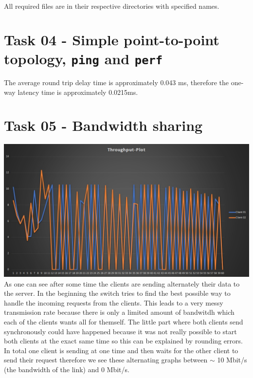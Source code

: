 \documentclass{article}
\begin{document}
	\pagestyle{fancy}
	
	All required files are in their respective directories with specified names.	
	
	\section*{Task 04 - Simple point-to-point topology, \texttt{ping} and \texttt{perf}}
	\begin{adjustwidth}{2em}{2em}
		The average round trip delay time is approximately 0.043 ms, therefore the one-way latency time is approximately 0.0215ms.
	\end{adjustwidth}
	
	\section*{Task 05 - Bandwidth sharing}
	\begin{adjustwidth}{2em}{2em}
		\includegraphics[scale=0.5]{Plot.jpg} \\
		As one can see after some time the clients are sending alternately their data to the server. In the beginning the switch tries to  find the best possible way to handle the incoming requests from the clients. This leads to a very messy transmission rate because there is only a limited amount of bandwitdh which each of the clients wants all for themself. The little part where both clients send synchronously could have happened because it was not really possible to start both clients at the exact same time so this can be explained by rounding errors. In total one client is sending at one time and then waits for the other client to send their request therefore we see these alternating graphs between $\sim$ 10 Mbit/s (the bandwidth of the link) and 0 Mbit/s.
	\end{adjustwidth}
\end{document}

